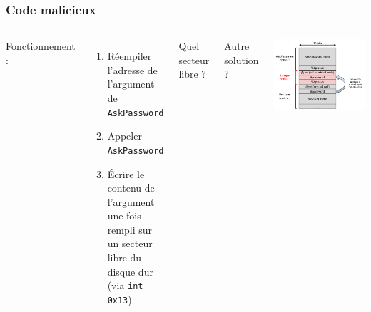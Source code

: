 \documentclass[red]{beamer}
\begin{document}
\begin{frame}
    \frametitle{Code malicieux}
    \begin{columns}
        Fonctionnement :
        \begin{enumerate}
            \item Réempiler l'adresse de l'argument de
            \texttt{AskPassword}
            \item Appeler \texttt{AskPassword}
            \item Écrire le contenu de l'argument une fois rempli
            sur un secteur libre du disque dur (via \texttt{int 0x13})
        \end{enumerate}
        
        Quel secteur libre ?
        
        Autre solution ? %
        
        \vspace{-1.5cm}
        \begin{center}
            \includegraphics[height=0.65\textheight]{img/pile_tc.png}
        \end{center}
    \end{columns}
\end{frame}
\end{document}
